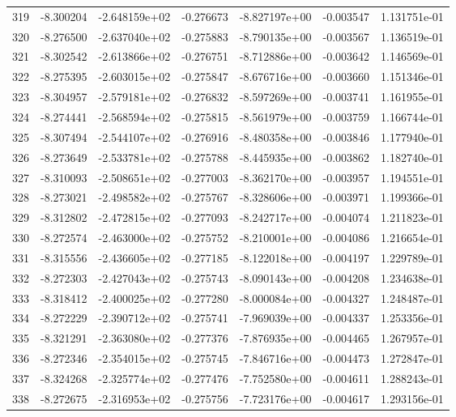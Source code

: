 \begin{tabular}{rrrrrrr}
 319 &  -8.300204 & -2.648159e+02 & -0.276673 & -8.827197e+00 &   -0.003547 &  1.131751e-01 \\
 320 &  -8.276500 & -2.637040e+02 & -0.275883 & -8.790135e+00 &   -0.003567 &  1.136519e-01 \\
 321 &  -8.302542 & -2.613866e+02 & -0.276751 & -8.712886e+00 &   -0.003642 &  1.146569e-01 \\
 322 &  -8.275395 & -2.603015e+02 & -0.275847 & -8.676716e+00 &   -0.003660 &  1.151346e-01 \\
 323 &  -8.304957 & -2.579181e+02 & -0.276832 & -8.597269e+00 &   -0.003741 &  1.161955e-01 \\
 324 &  -8.274441 & -2.568594e+02 & -0.275815 & -8.561979e+00 &   -0.003759 &  1.166744e-01 \\
 325 &  -8.307494 & -2.544107e+02 & -0.276916 & -8.480358e+00 &   -0.003846 &  1.177940e-01 \\
 326 &  -8.273649 & -2.533781e+02 & -0.275788 & -8.445935e+00 &   -0.003862 &  1.182740e-01 \\
 327 &  -8.310093 & -2.508651e+02 & -0.277003 & -8.362170e+00 &   -0.003957 &  1.194551e-01 \\
 328 &  -8.273021 & -2.498582e+02 & -0.275767 & -8.328606e+00 &   -0.003971 &  1.199366e-01 \\
 329 &  -8.312802 & -2.472815e+02 & -0.277093 & -8.242717e+00 &   -0.004074 &  1.211823e-01 \\
 330 &  -8.272574 & -2.463000e+02 & -0.275752 & -8.210001e+00 &   -0.004086 &  1.216654e-01 \\
 331 &  -8.315556 & -2.436605e+02 & -0.277185 & -8.122018e+00 &   -0.004197 &  1.229789e-01 \\
 332 &  -8.272303 & -2.427043e+02 & -0.275743 & -8.090143e+00 &   -0.004208 &  1.234638e-01 \\
 333 &  -8.318412 & -2.400025e+02 & -0.277280 & -8.000084e+00 &   -0.004327 &  1.248487e-01 \\
 334 &  -8.272229 & -2.390712e+02 & -0.275741 & -7.969039e+00 &   -0.004337 &  1.253356e-01 \\
 335 &  -8.321291 & -2.363080e+02 & -0.277376 & -7.876935e+00 &   -0.004465 &  1.267957e-01 \\
 336 &  -8.272346 & -2.354015e+02 & -0.275745 & -7.846716e+00 &   -0.004473 &  1.272847e-01 \\
 337 &  -8.324268 & -2.325774e+02 & -0.277476 & -7.752580e+00 &   -0.004611 &  1.288243e-01 \\
 338 &  -8.272675 & -2.316953e+02 & -0.275756 & -7.723176e+00 &   -0.004617 &  1.293156e-01 \\

\end{tabular}
